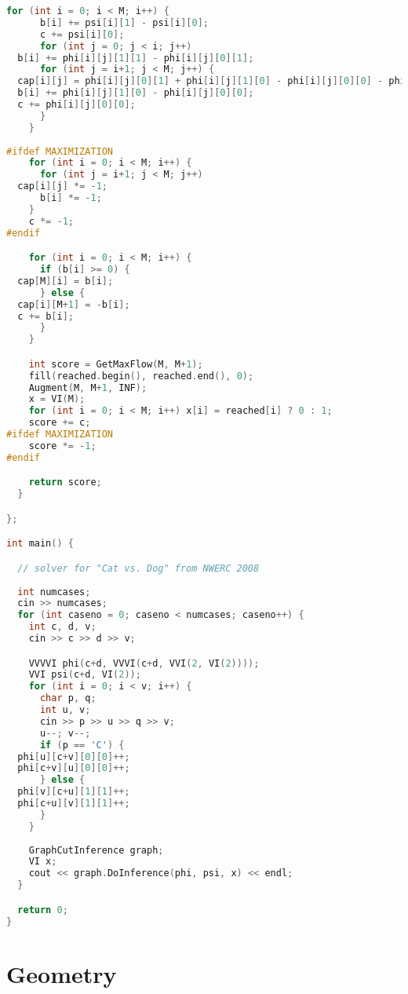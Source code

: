 \begin{lstlisting}[language=C++]
    for (int i = 0; i < M; i++) {
      b[i] += psi[i][1] - psi[i][0];
      c += psi[i][0];
      for (int j = 0; j < i; j++)
  b[i] += phi[i][j][1][1] - phi[i][j][0][1];
      for (int j = i+1; j < M; j++) {
  cap[i][j] = phi[i][j][0][1] + phi[i][j][1][0] - phi[i][j][0][0] - phi[i][j][1][1];
  b[i] += phi[i][j][1][0] - phi[i][j][0][0];
  c += phi[i][j][0][0];
      }
    }
    
#ifdef MAXIMIZATION
    for (int i = 0; i < M; i++) {
      for (int j = i+1; j < M; j++) 
  cap[i][j] *= -1;
      b[i] *= -1;
    }
    c *= -1;
#endif

    for (int i = 0; i < M; i++) {
      if (b[i] >= 0) {
  cap[M][i] = b[i];
      } else {
  cap[i][M+1] = -b[i];
  c += b[i];
      }
    }

    int score = GetMaxFlow(M, M+1);
    fill(reached.begin(), reached.end(), 0);
    Augment(M, M+1, INF);
    x = VI(M);
    for (int i = 0; i < M; i++) x[i] = reached[i] ? 0 : 1;
    score += c;
#ifdef MAXIMIZATION
    score *= -1;
#endif

    return score;
  }

};

int main() {

  // solver for "Cat vs. Dog" from NWERC 2008
  
  int numcases;
  cin >> numcases;
  for (int caseno = 0; caseno < numcases; caseno++) {
    int c, d, v;
    cin >> c >> d >> v;

    VVVVI phi(c+d, VVVI(c+d, VVI(2, VI(2))));
    VVI psi(c+d, VI(2));
    for (int i = 0; i < v; i++) {
      char p, q;
      int u, v;
      cin >> p >> u >> q >> v;
      u--; v--;
      if (p == 'C') {
  phi[u][c+v][0][0]++;
  phi[c+v][u][0][0]++;
      } else {
  phi[v][c+u][1][1]++;
  phi[c+u][v][1][1]++;
      }
    }
    
    GraphCutInference graph;
    VI x;
    cout << graph.DoInference(phi, psi, x) << endl;
  }

  return 0;
}

\end{lstlisting}
\section{Geometry}
